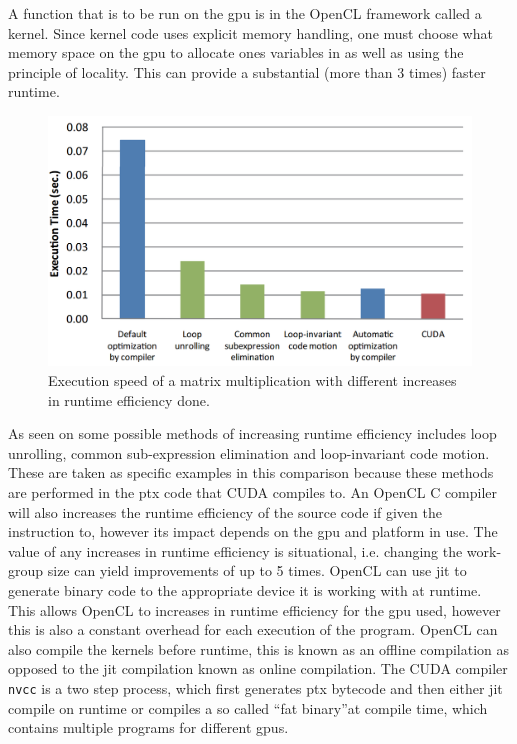 A function that is to be run on the \acrshort{gpu} is in the OpenCL framework called a kernel.
Since kernel code uses explicit memory handling, one must choose what memory space on the \acrshort{gpu} to allocate ones variables in as well as using the principle of locality.
This can provide a substantial (more than 3 times) faster runtime. \citep{ocl_lecture3}
\begin{figure}[h]
\centering	
 \includegraphics[width=1\textwidth]{figures/opencloptimisation.png} %
\caption{Execution speed of a matrix multiplication with different increases in runtime efficiency done. \citep{CUDAOpenCLOptimisation}}\label{image:OpenCLOptCompare}
\vspace{-15pt}
\end{figure}
As seen on  some possible methods of increasing runtime efficiency includes loop unrolling, common sub-expression elimination and loop-invariant code motion. 
These are taken as specific examples in this comparison because these methods are performed in the \acrfull{ptx} code that CUDA compiles to. %
An OpenCL C compiler will also increases the runtime efficiency of the source code if given the instruction to, however its impact depends on the \acrshort{gpu} and platform in use.
The value of any increases in runtime efficiency is situational, i.e. changing the work-group size can yield improvements of up to 5 times. \citep{ocl_lecture3}
OpenCL can use \acrshort{jit} to generate binary code to the appropriate device it is working with at runtime.
This allows OpenCL to increases in runtime efficiency for the \acrshort{gpu} used, however this is also a constant overhead for each execution of the program. 
OpenCL can also compile the kernels before runtime, this is known as an offline compilation as opposed to the \acrshort{jit} compilation known as online compilation. 
The CUDA compiler \texttt{nvcc} is a two step process, which first generates \acrshort{ptx} bytecode and then either \acrshort{jit} compile on runtime or compiles a so called ``fat binary''at compile time, which contains multiple programs for different \acrshort{gpu}s. \citep{nvidia_cude_fat_bin}

